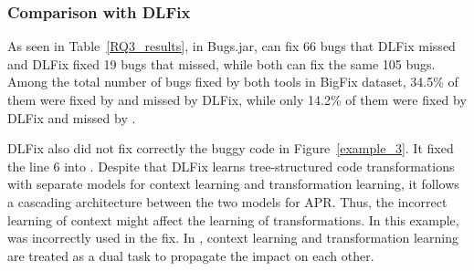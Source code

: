 \subsubsection{\bf Comparison with DLFix}

As seen in Table~\ref{RQ3_results}, in Bugs.jar, {\tool} can fix 66
bugs that DLFix missed and DLFix fixed 19 bugs that {\tool}
missed, while both can fix the same 105 bugs. Among the total
number of bugs fixed by both tools in BigFix dataset, 34.5\% of them
were fixed by {\tool} and missed by DLFix, while only 14.2\% of them
were fixed by DLFix and missed by {\tool}.

DLFix also did not fix correctly the buggy code in
Figure~\ref{example_3}. It fixed the line 6 into 
   \code{\%}
. Despite that DLFix learns tree-structured code
transformations with separate models for context learning and
transformation learning, it follows a cascading architecture between
the two models for APR. Thus, the incorrect learning of context might
affect the learning of transformations. In this example,
 was incorrectly used in the fix. In {\tool}, context
learning and transformation learning are treated as a dual task to
propagate the impact on each other.












